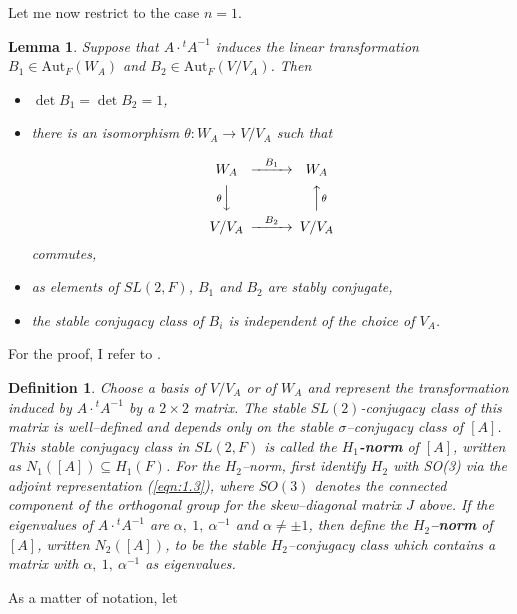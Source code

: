 \documentclass[12pt,letterpaper]{article}
\newtheorem{lemma}[theorem]{Lemma}
\newtheorem{definition}[theorem]{Definition}
\begin{document}
Let me now restrict to the case $n = 1$.

\begin{lemma}
\label{lemma:1.11} 
Suppose that $A\cdot {^{t}A^{-1}}$ induces the linear transformation
$B_1 \in \text{Aut}_F(W_A)$ and $B_2 \in \text{Aut}_F(V/V_A)$. Then

\begin{itemize}

\item[(a)] 
$\det B_1 = \det B_2 = 1$,

\item[(b)] 
there is an isomorphism $\theta : W_A \rightarrow V/V_A$ such that

\[
\begin{CD}
W_A @>B_1>>W_A\\
@V\theta VV @AA\theta A\\
V/V_A @>B_2>>V/V_A
\end{CD}
\]
commutes,

\item[(c)] 
as elements of $SL(2,F)$, $B_1$ and $B_2$ are stably conjugate,

\item[(d)] 
the stable conjugacy class of $B_i$ is independent of the choice 
of $V_A$.
\end{itemize}
\end{lemma}
 
For the proof, I refer to \cite{La1}.

\begin{definition}
\label{def:1.12} 
Choose a basis of $V/V_A$ or of $W_A$ and represent
the transformation induced by $A\cdot {^{t}A^{-1}}$ by a 
$2\times 2$ matrix. The stable
$SL(2)$-conjugacy class of this matrix is 
well--defined and depends only on the 
stable $\sigma$--conjugacy class of $[A]$. 
This stable conjugacy class in
$SL(2,F)$ is called the {\bf $H_1$-norm} of $[A]$, written as
$N_1([A]) \subseteq H_1(F)$. For the $H_2$--norm, first identify
$H_2$ with SO(3) via the adjoint representation (\ref{eqn:1.3}), 
where $SO(3)$ denotes the connected component of the orthogonal group for the 
skew--diagonal matrix $J$ above. If the eigenvalues of
$A\cdot {^{t}A^{-1}}$ are $\alpha,\ 1,\ \alpha^{-1}$ and 
$\alpha \not= \pm 1$, then
define the {\bf $H_2$--norm} of $[A]$, written $N_2([A])$, to be the
stable $H_2$--conjugacy class which contains a matrix with
$\alpha,\ 1,\ \alpha^{-1}$ as eigenvalues.
\end{definition}
 
As a matter of notation, let
\end{document}
